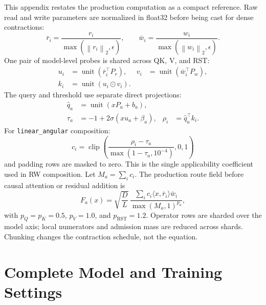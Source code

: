 \documentclass{article}
\newcommand{\norm}[1]{\left\lVert #1 \right\rVert}
\newcommand{\od}{\mathbin{\odot}}
\begin{document}
This appendix restates the production computation as a compact reference. Raw
read and write parameters are normalized in float32 before being cast for
dense contractions:
\[
\bar r_i=\frac{r_i}{\max(\norm{r_i}_2,\epsilon)},\qquad
\bar w_i=\frac{w_i}{\max(\norm{w_i}_2,\epsilon)}.
\]
One pair of model-level probes is shared across QK, V, and RST:
\[
\begin{aligned}
u_i&=\operatorname{unit}(\bar r_i^\top P_r),&
v_i&=\operatorname{unit}(\bar w_i^\top P_w),\\
k_i&=\operatorname{unit}(u_i\od v_i).&&
\end{aligned}
\]
The query and threshold use separate direct projections:
\[
\begin{aligned}
\hat q_a&=\operatorname{unit}(xP_a+b_a),\\
\tau_a&=-1+2\sigma(xu_a+\beta_a),&
\rho_i&=\hat q_a^\top k_i.
\end{aligned}
\]
For \texttt{linear\_angular} composition:
\[
c_i=
\operatorname{clip}\!\left(
\frac{\rho_i-\tau_a}{\max(1-\tau_a,10^{-4})},0,1\right)
\]
and padding rows are masked to zero. This is the single applicability
coefficient used in RW composition. Let \(M_a=\sum_i c_i\). The production
route field before causal attention or residual addition is
\[
F_a(x)=
\sqrt{\frac{D}{L}}\,
\frac{\sum_i c_i\langle x,\bar r_i\rangle\bar w_i}
{\max(M_a,1)^{p_a}},
\]
with \(p_Q=p_K=0.5\), \(p_V=1.0\), and \(p_{\mathrm{RST}}=1.2\).
Operator rows are sharded over the model axis; local numerators and admission
mass are reduced across shards. Chunking changes the contraction schedule, not
the equation.

\section{Complete Model and Training Settings}
\label{app:settings}
\end{document}
